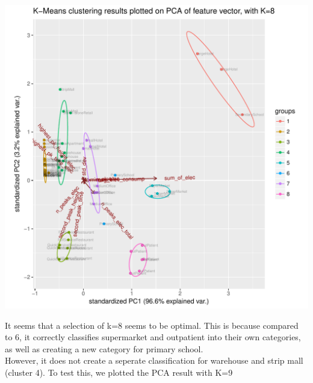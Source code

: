 \documentclass[12pt]{article}\usepackage[]{graphicx}\usepackage[]{color}
\makeatletter
\def\maxwidth{ %
  \ifdim\Gin@nat@width>\linewidth
    \linewidth
  \else
    \Gin@nat@width
  \fi
}
\newenvironment{knitrout}{}{} %
\makeatother
\begin{document}
\begin{knitrout}
\color{fgcolor}
\includegraphics[width=\maxwidth]{figure/pca_plot_2-1} 

\end{knitrout}


It seems that a selection of k=8 seems to be optimal. This is because compared to 6, it correctly classifies supermarket and outpatient into their own categories, as well as creating a new category for primary school. \\

However, it does not create a seperate classification for warehouse and strip mall (cluster 4). To test this, we plotted the PCA result with K=9
\end{document}

